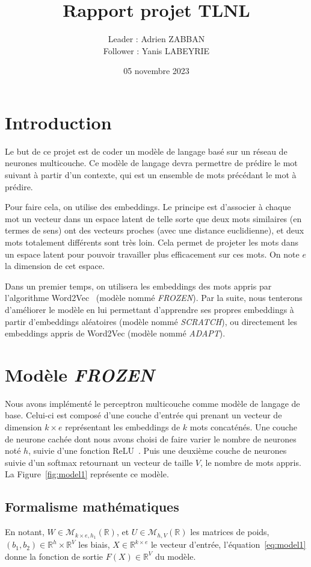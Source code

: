 \documentclass[a4paper]{article}
\title{Rapport projet TLNL}
\author{Leader : Adrien ZABBAN \\ Follower : Yanis LABEYRIE}
\date{05 novembre 2023}
\begin{document}
\maketitle


\section{Introduction}

Le but de ce projet est de coder un modèle de langage basé sur un réseau de neurones multicouche. Ce modèle de langage devra permettre 
de prédire le mot suivant à partir d'un contexte, qui est un ensemble de mots précédant le mot à prédire. 

Pour faire cela, on utilise des embeddings. Le principe est d'associer à chaque mot un vecteur dans un espace latent de telle sorte que 
deux mots similaires (en termes de sens) ont des vecteurs proches (avec une distance euclidienne), et deux mots totalement différents 
sont très loin. Cela permet de projeter les mots dans un espace latent pour pouvoir travailler plus efficacement sur ces mots. 
On note $e$ la dimension de cet espace.

Dans un premier temps, on utilisera les embeddings des mots appris par l'algorithme Word2Vec~\cite{mikolov2013efficient} 
(modèle nommé \textit{FROZEN}). Par la suite, nous tenterons d'améliorer le modèle en lui permettant d'apprendre ses propres 
embeddings à partir d'embeddings aléatoires (modèle nommé \textit{SCRATCH}), ou directement les embeddings appris de Word2Vec 
(modèle nommé \textit{ADAPT}).


\section{Modèle \textit{FROZEN}}

Nous avons implémenté le perceptron multicouche comme modèle de langage de base. Celui-ci est composé d'une couche d'entrée qui 
prenant un vecteur de dimension $k \times e$ représentant les embeddings de $k$ mots concaténés. Une couche de neurone cachée dont 
nous avons choisi de faire varier le nombre de neurones noté $h$, suivie d'une fonction ReLU~\cite{DBLP:journals/corr/abs-1803-08375}. 
Puis une deuxième couche de neurones suivie d'un softmax retournant un vecteur de taille $V$, le nombre de mots appris. 
La Figure~\ref{fig:model1} représente ce modèle.

\subsection{Formalisme mathématiques}
En notant, $W \in \mathcal{M}_{k \times e, h_1}(\mathbb{R})$, et $U \in \mathcal{M}_{h, V}(\mathbb{R})$ les matrices de poids, 
$(b_1,b_2) \in \mathbb{R}^{h} \times \mathbb{R}^{V}$ les biais, $X \in \mathbb{R}^{k \times e}$ le vecteur d'entrée, 
l'équation~\ref{eq:model1} donne la fonction de sortie $F(X) \in \mathbb{R}^{V}$ du modèle. 
\end{document}
